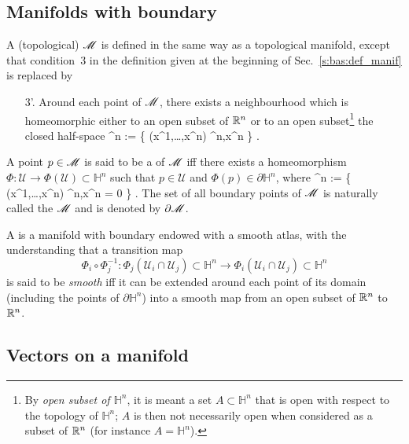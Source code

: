 \subsection{Manifolds with boundary} \label{s:bas:manif_boundary}

A (topological)  $\mathscr{M}$ is defined in the same way
as a topological manifold, except that condition~3 in the definition given
at the beginning of Sec.~\ref{s:bas:def_manif} is replaced by
\begin{itemize}
\item[3'.] Around each point of $\mathscr{M}$, there exists a neighbourhood which is
homeomorphic either to an open subset of $\mathbb{R}^n$ or to an open subset\footnote{By \emph{open subset of $\mathbb{H}^n$}, it is meant a set $A\subset \mathbb{H}^n$ that is open with respect to the topology of $\mathbb{H}^n$; $A$ is then not necessarily open when considered
as a subset of $\mathbb{R}^n$ (for instance $A=\mathbb{H}^n$).}
the closed half-space
\be
    ^n := \left\{ (x^1,\ldots,x^n) \in \R^n,\quad x^n  \right\} .
\ee
\end{itemize}
A point $p\in \mathscr{M}$ is said to be a  of $\mathscr{M}$ iff
there exists a homeomorphism $\Phi: \mathcal{U} \rightarrow \Phi(\mathcal U) \subset \mathbb{H}^n$ such that $p\in\mathcal{U}$ and $\Phi(p)\in \partial \mathbb{H}^n$, where
\be
    \partial{}^n := \left\{ (x^1,\ldots,x^n) \in \R^n,\quad x^n = 0 \right\} .
\ee
The set of all boundary points of $\mathscr{M}$ is naturally called the
 $\mathscr{M}$ and is denoted by
$\partial\mathscr{M}$.

A  is a manifold with boundary endowed with a
smooth atlas, with the understanding that a transition map
\[
    \Phi_i \circ \Phi_j^{-1} : \Phi_j(\mathcal{U}_i \cap \mathcal{U}_j)
    \subset \mathbb{H}^n \longrightarrow \Phi_i(\mathcal{U}_i \cap \mathcal{U}_j)
    \subset \mathbb{H}^n
\]
is said to be \emph{smooth} iff
it can be extended around each point of its domain
(including the points of $\partial\mathbb{H}^n$) into a smooth map
from an open subset of $\mathbb{R}^n$ to $\mathbb{R}^n$.

\subsection{Vectors on a manifold} \label{s:bas:vectors}

